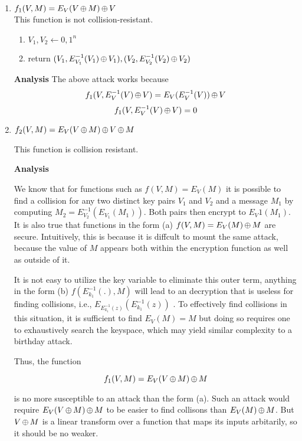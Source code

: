 \documentclass[11pt]{article}
\begin{document}
\begin{enumerate}
\item $f_1(V,M) = E_V(V {\,\oplus\,} M) {\,\oplus\,} V $\\

This function is not collision-resistant.

\begin{enumerate}
\item $V_1,V_2 \gets {0,1}^n$
\item return $(V_1, E^{-1}_{V_1}(V_1) {\,\oplus\,} V_1), (V_2, E^{-1}_{V_2}(V_2) {\,\oplus\,} V_2)$
\end{enumerate}

\textbf{Analysis}
The above attack works because \\
\[
f_1(V, E^{-1}_{V}(V) {\,\oplus\,} V) =  E_{V}(E^{-1}_{V}(V)) {\,\oplus\,} V
\]
\[
f_1(V, E^{-1}_{V}(V) {\,\oplus\,} V) =  0
\]


\item $f_2(V,M) = E_V(V {\,\oplus\,} M) {\,\oplus\,} V {\,\oplus\,} M$


This function is collision resistant. 

\textbf{Analysis}

We know that for functions such as $f(V,M) = E_V(M)$ it is possible to find a collision for any two distinct key pairs $V_1$ and $V_2$ and a message $M_1$ by computing $M_2 = E^{-1}_{V_2}(E_{V_1}(M_1))$.  Both pairs then encrypt to $E_V1(M_1)$.  It is also true that functions in the form (a) $f(V,M) = E_V(M) {\,\oplus\,} M$ are secure.  Intuitively, this is because it is diffcult to mount the same attack, because the value of $M$ appears both within the encryption function as well as outside of it.

It is not easy to utilize the key variable to eliminate this outer term, anything in the form (b) $f(E^{-1}_{k_1}(.),M)$ will lead to an decryption that is useless for finding collisions, i.e., $E_{E^{-1}_{k_1}(z)}( E^{-1}_{k_1}(z) )$ .  To effectively find collisions in this situation, it is sufficient to find $E_V(M) = M$ but doing so requires one to exhaustively search the keyspace, which may yield similar complexity to a birthday attack.

Thus, the function

\[
f_1(V,M) = E_V(V {\,\oplus\,} M) {\,\oplus\,} M 
\]

is no more susceptible to an attack than the form (a). Such an attack would require $E_V(V {\,\oplus\,} M) {\,\oplus\,} M$ to be easier to find collisons than $E_V(M) {\,\oplus\,} M$.  But $V {\,\oplus\,} M$ is a linear transform over a function that maps its inputs arbitarily, so it should be no weaker.


\end{enumerate}
\end{document}
